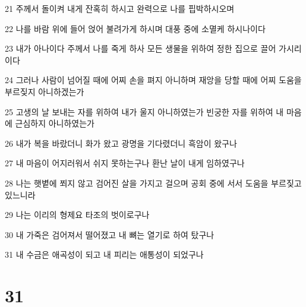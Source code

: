 \par 21 주께서 돌이켜 내게 잔혹히 하시고 완력으로 나를 핍박하시오며
\par 22 나를 바람 위에 들어 얹어 불려가게 하시며 대풍 중에 소멸케 하시나이다
\par 23 내가 아나이다 주께서 나를 죽게 하사 모든 생물을 위하여 정한 집으로 끌어 가시리이다
\par 24 그러나 사람이 넘어질 때에 어찌 손을 펴지 아니하며 재앙을 당할 때에 어찌 도움을 부르짖지 아니하겠는가
\par 25 고생의 날 보내는 자를 위하여 내가 울지 아니하였는가 빈궁한 자를 위하여 내 마음에 근심하지 아니하였는가
\par 26 내가 복을 바랐더니 화가 왔고 광명을 기다렸더니 흑암이 왔구나
\par 27 내 마음이 어지러워서 쉬지 못하는구나 환난 날이 내게 임하였구나
\par 28 나는 햇볕에 쬐지 않고 검어진 살을 가지고 걸으며 공회 중에 서서 도움을 부르짖고 있느니라
\par 29 나는 이리의 형제요 타조의 벗이로구나
\par 30 내 가죽은 검어져서 떨어졌고 내 뼈는 열기로 하여 탔구나
\par 31 내 수금은 애곡성이 되고 내 피리는 애통성이 되었구나

\chapter{31}

